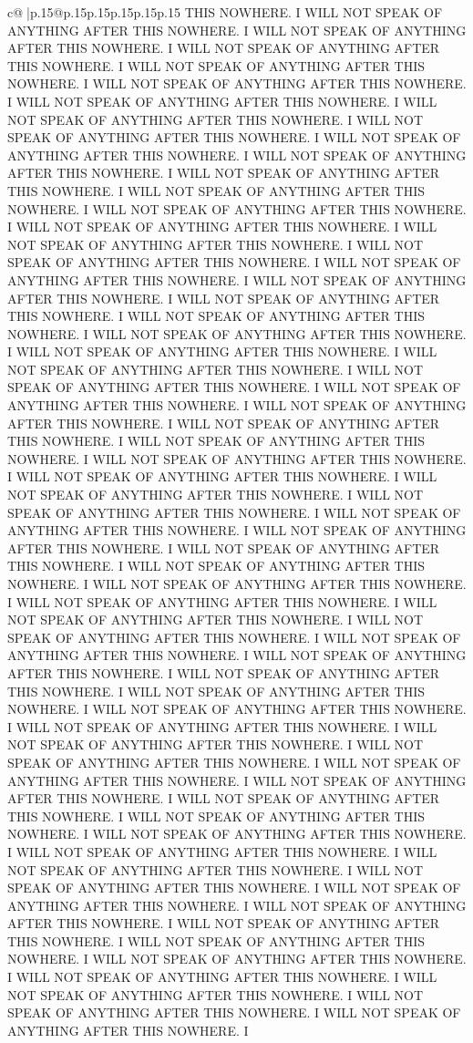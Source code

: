 \documentclass{article}
\begin{document}
{\begin{supertabular}{c@{$\;$}|p{.15\linewidth}@{}p{.15\linewidth}p{.15\linewidth}p{.15\linewidth}p{.15\linewidth}p{.15\linewidth}}
{{{THIS NOWHERE. I WILL NOT SPEAK OF ANYTHING AFTER THIS NOWHERE. I WILL NOT SPEAK OF ANYTHING AFTER THIS NOWHERE. I WILL NOT SPEAK OF ANYTHING AFTER THIS NOWHERE. I WILL NOT SPEAK OF ANYTHING AFTER THIS NOWHERE. I WILL NOT SPEAK OF ANYTHING AFTER THIS NOWHERE. I WILL NOT SPEAK OF ANYTHING AFTER THIS NOWHERE. I WILL NOT SPEAK OF ANYTHING AFTER THIS NOWHERE. I WILL NOT SPEAK OF ANYTHING AFTER THIS NOWHERE. I WILL NOT SPEAK OF ANYTHING AFTER THIS NOWHERE. I WILL NOT SPEAK OF ANYTHING AFTER THIS NOWHERE. I WILL NOT SPEAK OF ANYTHING AFTER THIS NOWHERE. I WILL NOT SPEAK OF ANYTHING AFTER THIS NOWHERE. I WILL NOT SPEAK OF ANYTHING AFTER THIS NOWHERE. I WILL NOT SPEAK OF ANYTHING AFTER THIS NOWHERE. I WILL NOT SPEAK OF ANYTHING AFTER THIS NOWHERE. I WILL NOT SPEAK OF ANYTHING AFTER THIS NOWHERE. I WILL NOT SPEAK OF ANYTHING AFTER THIS NOWHERE. I WILL NOT SPEAK OF ANYTHING AFTER THIS NOWHERE. I WILL NOT SPEAK OF ANYTHING AFTER THIS NOWHERE. I WILL NOT SPEAK OF ANYTHING AFTER THIS NOWHERE. I WILL NOT SPEAK OF ANYTHING AFTER THIS NOWHERE. I WILL NOT SPEAK OF ANYTHING AFTER THIS NOWHERE. I WILL NOT SPEAK OF ANYTHING AFTER THIS NOWHERE. I WILL NOT SPEAK OF ANYTHING AFTER THIS NOWHERE. I WILL NOT SPEAK OF ANYTHING AFTER THIS NOWHERE. I WILL NOT SPEAK OF ANYTHING AFTER THIS NOWHERE. I WILL NOT SPEAK OF ANYTHING AFTER THIS NOWHERE. I WILL NOT SPEAK OF ANYTHING AFTER THIS NOWHERE. I WILL NOT SPEAK OF ANYTHING AFTER THIS NOWHERE. I WILL NOT SPEAK OF ANYTHING AFTER THIS NOWHERE. I WILL NOT SPEAK OF ANYTHING AFTER THIS NOWHERE. I WILL NOT SPEAK OF ANYTHING AFTER THIS NOWHERE. I WILL NOT SPEAK OF ANYTHING AFTER THIS NOWHERE. I WILL NOT SPEAK OF ANYTHING AFTER THIS NOWHERE. I WILL NOT SPEAK OF ANYTHING AFTER THIS NOWHERE. I WILL NOT SPEAK OF ANYTHING AFTER THIS NOWHERE. I WILL NOT SPEAK OF ANYTHING AFTER THIS NOWHERE. I WILL NOT SPEAK OF ANYTHING AFTER THIS NOWHERE. I WILL NOT SPEAK OF ANYTHING AFTER THIS NOWHERE. I WILL NOT SPEAK OF ANYTHING AFTER THIS NOWHERE. I WILL NOT SPEAK OF ANYTHING AFTER THIS NOWHERE. I WILL NOT SPEAK OF ANYTHING AFTER THIS NOWHERE. I WILL NOT SPEAK OF ANYTHING AFTER THIS NOWHERE. I WILL NOT SPEAK OF ANYTHING AFTER THIS NOWHERE. I WILL NOT SPEAK OF ANYTHING AFTER THIS NOWHERE. I WILL NOT SPEAK OF ANYTHING AFTER THIS NOWHERE. I WILL NOT SPEAK OF ANYTHING AFTER THIS NOWHERE. I WILL NOT SPEAK OF ANYTHING AFTER THIS NOWHERE. I WILL NOT SPEAK OF ANYTHING AFTER THIS NOWHERE. I WILL NOT SPEAK OF ANYTHING AFTER THIS NOWHERE. I WILL NOT SPEAK OF ANYTHING AFTER THIS NOWHERE. I WILL NOT SPEAK OF ANYTHING AFTER THIS NOWHERE. I WILL NOT SPEAK OF ANYTHING AFTER THIS NOWHERE. I WILL NOT SPEAK OF ANYTHING AFTER THIS NOWHERE. I WILL NOT SPEAK OF ANYTHING AFTER THIS NOWHERE. I WILL NOT SPEAK OF ANYTHING AFTER THIS NOWHERE. I WILL NOT SPEAK OF ANYTHING AFTER THIS NOWHERE. I WILL NOT SPEAK OF ANYTHING AFTER THIS NOWHERE. I WILL NOT SPEAK OF ANYTHING AFTER THIS NOWHERE. I WILL NOT SPEAK OF ANYTHING AFTER THIS NOWHERE. I WILL NOT SPEAK OF ANYTHING AFTER THIS NOWHERE. I WILL NOT SPEAK OF ANYTHING AFTER THIS NOWHERE. I WILL NOT SPEAK OF ANYTHING AFTER THIS NOWHERE. I WILL NOT SPEAK OF ANYTHING AFTER THIS NOWHERE. I WILL NOT SPEAK OF ANYTHING AFTER THIS NOWHERE. I }}}
\end{supertabular}}
\end{document}
